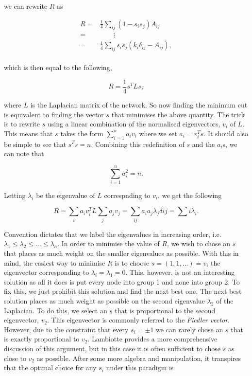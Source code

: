 we can rewrite $R$ as

$$
\begin{aligned}
    R =& \frac{1}{4}\sum_{ij}(1 - s_i s_j)A_{ij} \\
      =& \qquad \vdots \\
      =& \frac{1}{4}\sum_{ij}s_i s_j(k_i\delta_{ij} - A_{ij}), \\
\end{aligned}
$$

which is then equal to the following,

$$ R = \frac{1}{4}s^TLs, $$

where $L$ is the Laplacian matrix of the network. So now finding the minimum cut is equivalent to finding the vector $s$ that minimises the above quantity. The trick is to rewrite $s$ using a linear combination of the normalised eigenvectors, $v_i$ of $L$. This means that $s$ takes the form $\sum_{i=1}^n a_iv_i$ where we set $a_i = v_i^T s$. It should also be simple to see that $s^Ts = n$. Combining this redefinition of $s$ and the $a_i$s, we can note that

$$ \sum_{i=1}^n a_i^2 = n. $$

Letting $\lambda_i$ be the eigenvalue of $L$ correspnding to $v_i$, we get the following

$$ R = \sum_i a_iv_i^TL\sum_ja_jv_j = \sum_{ij}a_ia_j\lambda_j\delta{ij} = \sum{i}\lambda_i. $$

Convention dictates that we label the eigenvalues in increasing order, i.e. $\lambda_1 \leq \lambda_2 \leq \dots \leq \lambda_n$. In order to minimise the value of $R$, we wish to chose an $s$ that places as much weight on the smaller eigenvalues as possible. With this in mind, the easiest way to minimise $R$ is to choose $s = (1, 1, \dots) = v_i$ the eigenvector corresponding to $\lambda_i = \lambda_1 = 0$. This, however, is not an interesting solution as all it does is put every node into group 1 and none into group 2. To fix this, we just prohibit this solution and find the next best one. The next best solution places as much weight as possible on the second eigenvalue $\lambda_2$ of the Laplacian. To do this, we select an $s$ that is proportional to the second eigenvector, $v_2$. This eigenvector is commonly referred to the \emph{Fiedler vector}. However, due to the constraint that every $s_i = \pm 1$ we can rarely chose an $s$ that is exactly proportional to $v_2$. Lambiotte provides a more comprehensive discussion of this argument, but in this case it is often sufficient to chose $s$ as close to $v_2$ as possible. After some more algebra and manipulation, it transpires that the optimal choice for any $s_i$ under this paradigm is 

